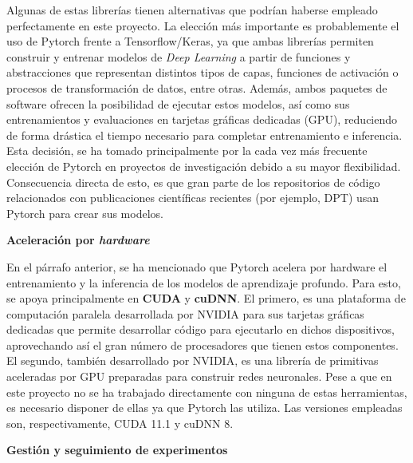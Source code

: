 Algunas de estas librerías tienen alternativas que podrían haberse empleado perfectamente en este proyecto. La elección más importante es probablemente el uso de Pytorch frente a Tensorflow/Keras, ya que ambas librerías permiten construir y entrenar modelos de \textit{Deep Learning} a partir de funciones y abstracciones que representan distintos tipos de capas, funciones de activación o procesos de transformación de datos, entre otras. Además, ambos paquetes de software ofrecen la posibilidad de ejecutar estos modelos, así como sus entrenamientos y evaluaciones en tarjetas gráficas dedicadas (GPU), reduciendo de forma drástica el tiempo necesario para completar entrenamiento e inferencia. Esta decisión, se ha tomado principalmente por la cada vez más frecuente elección de Pytorch en proyectos de investigación debido a su mayor flexibilidad. Consecuencia directa de esto, es que gran parte de los repositorios de código relacionados con publicaciones científicas recientes (por ejemplo, DPT) usan Pytorch para crear sus modelos.

\textbf{Aceleración por \textit{hardware}}

En el párrafo anterior, se ha mencionado que Pytorch acelera por hardware el entrenamiento y la inferencia de los modelos de aprendizaje profundo. Para esto, se apoya principalmente en \textbf{CUDA} y \textbf{cuDNN}. El primero, es una plataforma de computación paralela desarrollada por NVIDIA para sus tarjetas gráficas dedicadas que permite desarrollar código para ejecutarlo en dichos dispositivos, aprovechando así el gran número de procesadores que tienen estos componentes. El segundo, también desarrollado por NVIDIA, es una librería de primitivas aceleradas por GPU preparadas para construir redes neuronales. Pese a que en este proyecto no se ha trabajado directamente con ninguna de estas herramientas, es necesario disponer de ellas ya que Pytorch las utiliza. Las versiones empleadas son, respectivamente, CUDA 11.1 y cuDNN 8.

\textbf{Gestión y seguimiento de experimentos}

